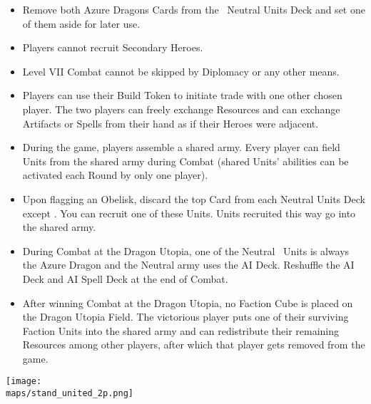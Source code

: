 \begin{multicols}{2}
\begin{itemize}
  \item Remove both Azure Dragons Cards from the \azure\ Neutral Units Deck and set one of them aside for later use.
  \item Players cannot recruit Secondary Heroes.
  \item Level VII Combat cannot be skipped by Diplomacy or any other means.
  \item Players can use their Build Token to initiate trade with one other chosen player. The two players can freely exchange Resources and can exchange Artifacts or Spells from their hand as if their Heroes were adjacent.
  \item During the game, players assemble a shared army. Every player can field Units from the shared army during Combat (shared Units'  abilities can be activated each Round by only one player).  %
  \item Upon flagging an Obelisk, discard the top Card from each Neutral Units Deck except \azure{}. You can recruit one of these Units. Units recruited this way go into the shared army.
  \item During Combat at the Dragon Utopia, one of the Neutral \azure\ Units is always the Azure Dragon and the Neutral army uses the AI Deck. Reshuffle the AI Deck and AI Spell Deck at the end of Combat.
  \item After winning Combat at the Dragon Utopia, no Faction Cube is placed on the Dragon Utopia Field. The victorious player puts one of their surviving Faction Units into the shared army and can redistribute their remaining Resources among other players, after which that player gets removed from the game.
\end{itemize}

\columnbreak

\begin{center}
  \texttt{[image: \\maps/stand\_united\_2p.png]}
\end{center}

\vspace*{\fill}

\end{multicols}


